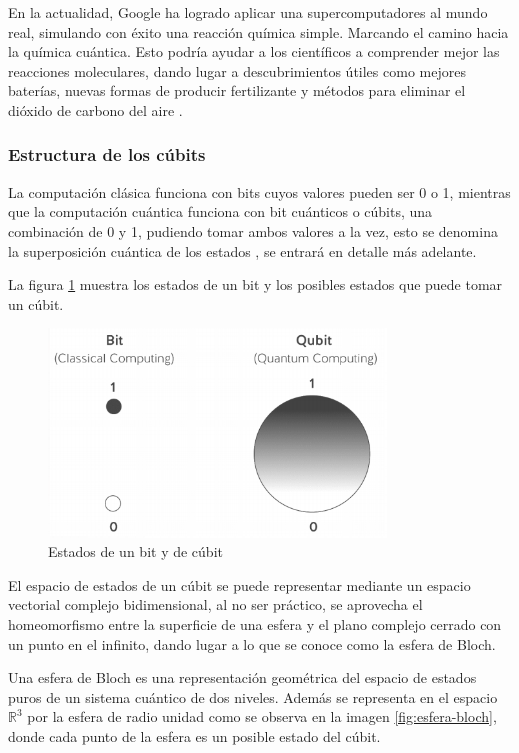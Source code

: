 En la actualidad, Google ha logrado aplicar una supercomputadores al mundo real, simulando con éxito una reacción química simple. Marcando el camino hacia la química cuántica. Esto podría ayudar a los científicos a comprender mejor las reacciones moleculares, dando lugar a descubrimientos útiles como mejores baterías, nuevas formas de producir fertilizante y métodos para eliminar el dióxido de carbono del aire \cite{quimica-cuantica}.

\subsubsection{Estructura de los cúbits}

La computación clásica funciona con bits cuyos valores pueden ser 0 o 1, mientras que la computación cuántica funciona con bit cuánticos o cúbits, una combinación de 0 y 1, pudiendo tomar ambos valores a la vez, esto se denomina la superposición cuántica de los estados \cite{computacion-cuantica-criptografia}, se entrará en detalle más adelante.

La figura \ref{fig:bit-cubit} muestra los estados de un bit y los posibles estados que puede tomar un cúbit. 

\begin{figure}[h]
	\centering
	\includegraphics[width=0.8\textwidth]{figuras/bit_cubit.png}
	\caption{Estados de un bit y de cúbit \cite{clasica-vs-cuantica}}
	\label{fig:bit-cubit}
\end{figure}

El espacio de estados de un cúbit se puede representar mediante un espacio vectorial complejo bidimensional, al no ser práctico, se aprovecha el homeomorfismo entre la superficie de una esfera y el plano complejo cerrado con un punto en el infinito, dando lugar a lo que se conoce como la esfera de Bloch.  

Una esfera de Bloch es una representación geométrica del espacio de estados puros de un sistema cuántico de dos niveles. Además se representa en el espacio $\mathds{R}^3$ por la esfera de radio unidad como se observa en la imagen \ref{fig:esfera-bloch}, donde cada punto de la esfera es un posible estado del cúbit. 


